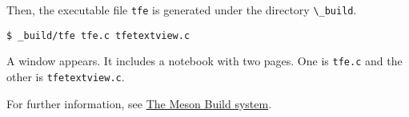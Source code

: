 Then, the executable file \passthrough{\lstinline!tfe!} is generated
under the directory \passthrough{\lstinline!\_build!}.

\begin{lstlisting}
$ _build/tfe tfe.c tfetextview.c
\end{lstlisting}

A window appears. It includes a notebook with two pages. One is
\passthrough{\lstinline!tfe.c!} and the other is
\passthrough{\lstinline!tfetextview.c!}.

For further information, see \href{https://mesonbuild.com/}{The Meson
Build system}.
